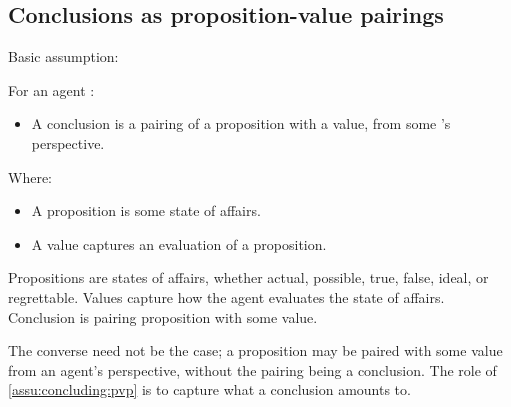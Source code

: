 \subsection{Conclusions as proposition-value pairings}
\label{cha:clar:sec:CCC:pvp}

\begin{note}
  Basic assumption:

  \begin{assumption}
    \label{assu:concluding:pvp}
    For an agent \vAgent{}:

    \begin{itemize}
    \item
      A conclusion is a pairing of a proposition with a value, from some \vAgent{}'s perspective.
    \end{itemize}

    Where:
    \begin{itemize}[noitemsep]
    \item
      A proposition is some state of affairs.
    \item
      A value captures an evaluation of a proposition.
    \end{itemize}
  \end{assumption}

  Propositions are states of affairs, whether actual, possible, true, false, ideal, or regrettable.
  Values capture how the agent evaluates the state of affairs.
  Conclusion is pairing proposition with some value.

  The converse need not be the case; a proposition may be paired with some value from an agent's perspective, without the pairing being a conclusion.
  The role of \autoref{assu:concluding:pvp} is to capture what a conclusion amounts to.
\end{note}

